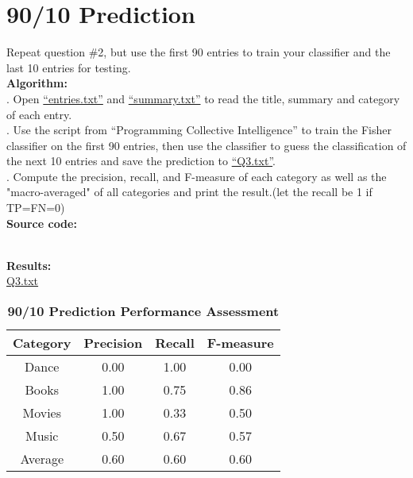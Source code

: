 \documentclass{article}
\begin{document}
		\section{90/10 Prediction}
		Repeat question \#2, but use the first 90 entries to train your classifier and the last 10 entries for testing.\\

		\noindent\textbf{Algorithm:}\\
		. Open \href{https://github.com/zhangboroy/cs532-s17/blob/master/assg09_submission/entries.txt}{``entries.txt''} and \href{https://github.com/zhangboroy/cs532-s17/blob/master/assg09_submission/summary.txt}{``summary.txt''} to read the title, summary and category of each entry.\\
		. Use the script from ``Programming Collective Intelligence'' to train the Fisher classifier on the first 90 entries, then use the classifier to guess the classification of the next 10 entries and save the prediction to \href{https://github.com/zhangboroy/cs532-s17/blob/master/assg09_submission/Q3.txt}{``Q3.txt''}.\\
		. Compute the precision, recall, and F-measure of each category as well as the "macro-averaged"
of all categories and print the result.(let the recall be 1 if TP=FN=0)\\

		\noindent\textbf{Source code:}
		

		\noindent\\\textbf{Results:}\\
		\indent\href{https://github.com/zhangboroy/cs532-s17/blob/master/assg09_submission/Q3.txt}{Q3.txt}
		\begin{table}[!htb]
			\centering
			\caption{\textbf{90/10 Prediction Performance Assessment}}
			\begin{tabular}{cccc}
				\toprule
				\textbf{Category} & \textbf{Precision} & \textbf{Recall} & \textbf{F-measure}\\
				\midrule
				Dance & 0.00 & 1.00 & 0.00\\
				Books & 1.00 & 0.75 & 0.86\\
				Movies & 1.00 & 0.33 & 0.50\\
				Music & 0.50 & 0.67 & 0.57\\
				Average & 0.60 & 0.60 & 0.60\\			
				\bottomrule
			\end{tabular}
		\end{table}
	
\end{document}

